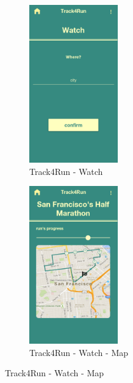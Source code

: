 \begin{figure}[H]
\centering
\begin{subfigure}{.5\textwidth}
    \includegraphics[width=.9\linewidth, height = 6.8cm, keepaspectratio]{./Images/Mockups/Track4Run/T4R_Watch.png}
    \centering
    \caption{Track4Run - Watch}
  \end{subfigure}%
\begin{subfigure}{.5\textwidth}
    \includegraphics[width=.9\linewidth, height = 6.8cm, keepaspectratio]{./Images/Mockups/Track4Run/T4R_Watch_Map.png}
    \centering
    \caption{Track4Run - Watch - Map}
  \end{subfigure}
\end{figure}


